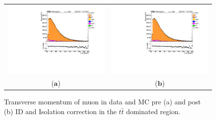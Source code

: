 \begin{figure}[htp]
\centering
\begin{tabular}{cc}
\hspace{-0.5cm}
\includegraphics[scale=0.45]{fig/chapt7/correction/id_iso_nocorrection_Pt_lep.pdf}
& \hspace{-1.50cm} \includegraphics[scale=0.45]{fig/chapt7/correction/id_iso_corrected_Pt_lep.pdf}\\
  \qquad ($\mathbf{a}$)\qquad\qquad&($\mathbf{b}$)\qquad\qquad\qquad\qquad \\
\end{tabular}
\caption{Transverse momentum of muon in data and MC pre (a) and post (b) ID and Isolation correction in the $t\bar{t}$ dominated region.}\label{fig:lepidiso_correction}
\end{figure}

